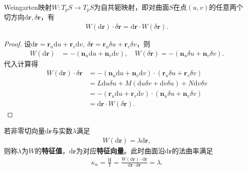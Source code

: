 \documentclass[../../main.tex]{subfiles}%
\begin{document}
\begin{theorem}
Weingarten映射$W:T_pS\to T_pS$为自共轭映射，即对曲面$S$在点$(u,v)$的任意两个切方向$\mathrm{d}\boldsymbol{r},\delta\boldsymbol{r}$，有
\begin{align}
W(\mathrm{d}\boldsymbol{r})\cdot\delta\boldsymbol{r}=\mathrm{d}\boldsymbol{r}\cdot W(\delta\boldsymbol{r}).\label{eq:self_conjugate}
\end{align}
\end{theorem}
\begin{proof}

设$\mathrm{d}\boldsymbol{r}=\boldsymbol{r}_u\mathrm{d}u+\boldsymbol{r}_v\mathrm{d}v,\ \delta\boldsymbol{r}=\boldsymbol{r}_u\delta u+\boldsymbol{r}_v\delta v$，则
\begin{align*}
W(\mathrm{d}\boldsymbol{r})&=-(\boldsymbol{n}_u\mathrm{d}u+\boldsymbol{n}_v\mathrm{d}v),\quad W(\delta\boldsymbol{r})=-(\boldsymbol{n}_u\delta u+\boldsymbol{n}_v\delta v).
\end{align*}
代入计算得
\begin{align*}
W(\mathrm{d}\boldsymbol{r})\cdot\delta\boldsymbol{r}&=-(\boldsymbol{n}_u\mathrm{d}u+\boldsymbol{n}_v\mathrm{d}v)\cdot(\boldsymbol{r}_u\delta u+\boldsymbol{r}_v\delta v)\\
&=L\mathrm{d}u\delta u+M(\mathrm{d}u\delta v+\mathrm{d}v\delta u)+N\mathrm{d}v\delta v\\
&=-(\boldsymbol{r}_u\mathrm{d}u+\boldsymbol{r}_v\mathrm{d}v)\cdot(\boldsymbol{n}_u\delta u+\boldsymbol{n}_v\delta v)\\
&=\mathrm{d}\boldsymbol{r}\cdot W(\delta\boldsymbol{r}).
\end{align*}

\end{proof}

\begin{definition}
若非零切向量$\mathrm{d}\boldsymbol{r}$与实数$\lambda$满足
\begin{align}
W(\mathrm{d}\boldsymbol{r})=\lambda\mathrm{d}\boldsymbol{r},\label{eq:eigen_weingarten}
\end{align}
则称$\lambda$为$W$的\textbf{特征值}，$\mathrm{d}\boldsymbol{r}$为对应\textbf{特征向量}。此时曲面沿$\mathrm{d}\boldsymbol{r}$的法曲率满足
\begin{align}
\kappa_n=\frac{\mathrm{II}}{\mathrm{I}}=\frac{W(\mathrm{d}\boldsymbol{r})\cdot\mathrm{d}\boldsymbol{r}}{\mathrm{d}\boldsymbol{r}\cdot\mathrm{d}\boldsymbol{r}}=\lambda.\label{eq:kn_eigenvalue}
\end{align}
\end{definition}
\end{document}
